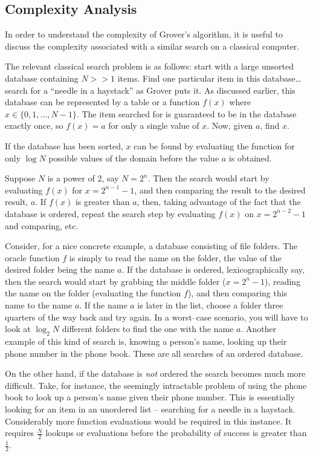 \subsection{Complexity Analysis}

In order to understand the complexity of Grover's algorithm,
it is useful to discuss the complexity associated with a 
similar search on a classical computer.

The relevant classical search problem is as follows:  
start with a large unsorted database containing $N>>1$ items.
Find one particular item in this database\dots
search for a ``needle in a haystack'' as Grover puts
it\cite{Grover:96}.  As discussed earlier, this database can 
be represented by a table or a function $f(x)$ where
$x\in\lbrace 0,1,\ldots,N-1\rbrace$.
The item searched for is guaranteed to be in the database
exactly once, so $f(x)=a$ for only a single 
value of $x$. Now, given $a$, find $x$.

If the database has been sorted, $x$ can be found by 
evaluating the function for only $\log N$ possible 
values of the domain before the value $a$ is obtained.

Suppose $N$ is a power of 2, say $N=2^n$.  Then the search
would start by evaluating $f(x)$ for $x=2^{n-1}-1$,
and then comparing the result to the desired result, $a$.
If $f(x)$ is greater than $a$, then, taking advantage of the
fact that the database is ordered, repeat the search
step by evaluating $f(x)$ on $x=2^{n-2}-1$ and comparing,
etc.  

Consider, for a nice concrete example, a database consisting
of file folders.  The oracle function $f$ is simply to read
the name on the folder, the value of the desired folder being
the name $a$.  If the database is ordered, lexicographically say,
then the search would start by grabbing the middle folder
($x=2^n-1$), reading the name on the folder (evaluating the
function $f$), and then comparing this name to the name $a$.
If the name $a$ is later in the list, choose a folder three
quarters of the way back and try again.  In a worst--case
scenario, you will have to look at $\log_2 N$ different 
folders to find the one with the name $a$.  
Another example of this kind of search
is, knowing a person's name, looking up their phone number in
the phone book.  These are all searches of an ordered database.

On the other hand, if the database is {\sl not} ordered the search
becomes much more difficult.  Take, for instance, the seemingly
intractable problem of using the phone book to look up a 
person's name given their phone number.  This is essentially
looking for an item in an unordered list -- searching for a 
needle in a haystack.  Considerably more function evaluations
would be required in this instance.  It requires $\frac{N}{2}$
lookups or evaluations before the probability of success is 
greater than $\frac{1}{2}$.

